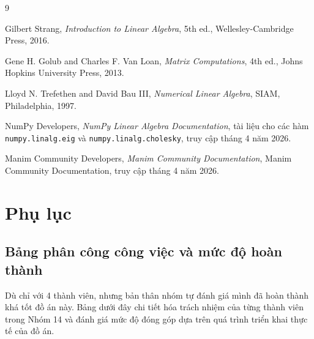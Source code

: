 \documentclass[12pt,a4paper]{article}
\begin{document}
\newpage
\begingroup
\begin{thebibliography}{9}
\raggedright
       
    Gilbert Strang, \emph{Introduction to Linear Algebra}, 5th ed., Wellesley-Cambridge Press, 2016.

    Gene H. Golub and Charles F. Van Loan, \emph{Matrix Computations}, 4th ed., Johns Hopkins University Press, 2013.

    Lloyd N. Trefethen and David Bau III, \emph{Numerical Linear Algebra}, SIAM, Philadelphia, 1997.

    NumPy Developers, \emph{NumPy Linear Algebra Documentation}, tài liệu cho các hàm \texttt{numpy.linalg.eig} và \texttt{numpy.linalg.cholesky}, truy cập tháng 4 năm 2026.

    Manim Community Developers, \emph{Manim Community Documentation}, Manim Community Documentation, truy cập tháng 4 năm 2026.
    
\end{thebibliography}
\endgroup

\newpage
\appendix
\section{Phụ lục}
\subsection{Bảng phân công công việc và mức độ hoàn thành}
Dù chỉ với 4 thành viên, nhưng bản thân nhóm tự đánh giá mình đã hoàn thành khá tốt đồ án này. Bảng dưới đây chi tiết hóa trách nhiệm của từng thành viên trong Nhóm 14 và đánh giá mức độ đóng góp dựa trên quá trình triển khai thực tế của đồ án. 

\begin{table}[H]
    \centering
    \renewcommand{\arraystretch}{1.2}
    \caption{Chi tiết phân công nhiệm vụ Nhóm 14}
\end{table}
\end{document}
